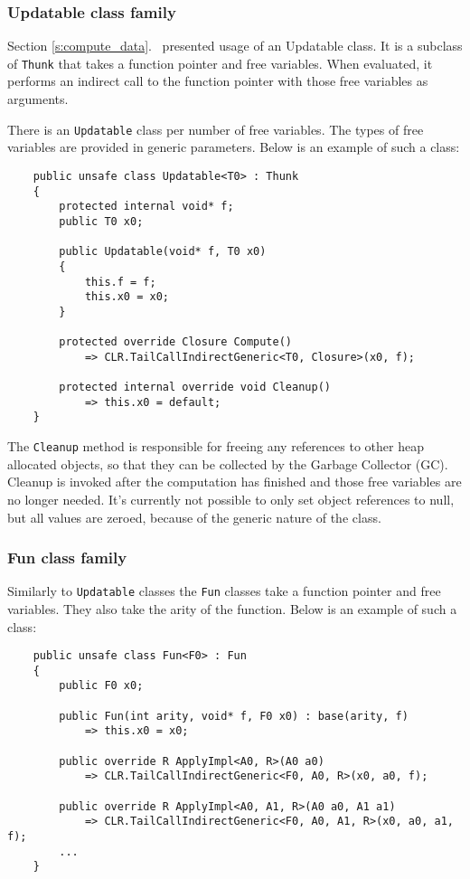 \documentclass[en]{pracamgr}
\newcommand{\myref}[1]{\ref{#1}.~\textit{\nameref{#1}}}
\begin{document}

\subsubsection{Updatable class family}\label{s:updatables}

Section \myref{s:compute_data} presented usage of an Updatable class.
It is a subclass of \texttt{Thunk} that takes a function
pointer and free variables. When evaluated, it performs an
indirect call to the function pointer with those free variables as arguments.

There is an \texttt{Updatable} class per number of free variables. The types of free variables are provided in generic parameters. Below is an example of such a class:

\begin{verbatim}
    public unsafe class Updatable<T0> : Thunk
    {
        protected internal void* f;
        public T0 x0;

        public Updatable(void* f, T0 x0)
        {
            this.f = f;
            this.x0 = x0;
        }

        protected override Closure Compute()
            => CLR.TailCallIndirectGeneric<T0, Closure>(x0, f);
        
        protected internal override void Cleanup()
            => this.x0 = default;
    }
\end{verbatim}

The \texttt{Cleanup} method is responsible for freeing
any references to other heap allocated objects, so that
they can be collected by the Garbage Collector (GC).
Cleanup is invoked after the computation has finished
and those free variables are no longer needed.
It's currently not possible to only set object references to null,
but all values are zeroed, because of the generic nature
of the class.

\subsubsection{Fun class family}

Similarly to \texttt{Updatable} classes the \texttt{Fun}
classes take a function pointer and free variables.
They also take the arity of the function.
Below is an example of such a class:

\begin{verbatim}
    public unsafe class Fun<F0> : Fun
    {
        public F0 x0;

        public Fun(int arity, void* f, F0 x0) : base(arity, f)
            => this.x0 = x0;

        public override R ApplyImpl<A0, R>(A0 a0)
            => CLR.TailCallIndirectGeneric<F0, A0, R>(x0, a0, f);

        public override R ApplyImpl<A0, A1, R>(A0 a0, A1 a1)
            => CLR.TailCallIndirectGeneric<F0, A0, A1, R>(x0, a0, a1, f);
        ...
    }
\end{verbatim}
\end{document}
